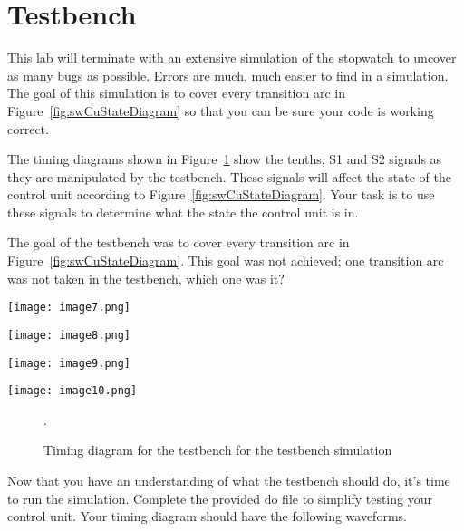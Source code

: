 \section{Testbench}
This lab will terminate with an extensive simulation of the stopwatch to
uncover as many bugs as
possible. Errors are much, much easier to find in a
simulation. The goal of this simulation is to cover every transition arc
in Figure~\ref{fig:swCuStateDiagram} so that you can be sure your code is working correct.

The timing diagrams shown in Figure~\ref{fig:swCuSimTiming} show the tenths,
S1 and S2 signals as they are manipulated by the testbench. These
signals will affect the state of the control unit according to Figure~\ref{fig:swCuStateDiagram}.
Your task is to use these signals to determine what the state the
control unit is in.

The goal of the testbench was to cover every transition arc in Figure~\ref{fig:swCuStateDiagram}.
This goal was not achieved; one transition arc was not taken in the
testbench, which one was it?

\begin{landscape}

\texttt{[image: image7.png]}

\texttt{[image: image8.png]}

\texttt{[image: image9.png]}

\texttt{[image: image10.png]}
\begin{figure}
    \caption{Timing diagram for the testbench for the testbench simulation}.
    \label{fig:swCuSimTiming}
\end{figure}
\end{landscape}

Now that you have an understanding of what the testbench should do, it's
time to run the simulation. Complete the provided do file to simplify
testing your control unit. Your timing diagram should have the following
\hypertarget{swCuWaveform}{%
waveforms.
\label{swCuWaveform}}

